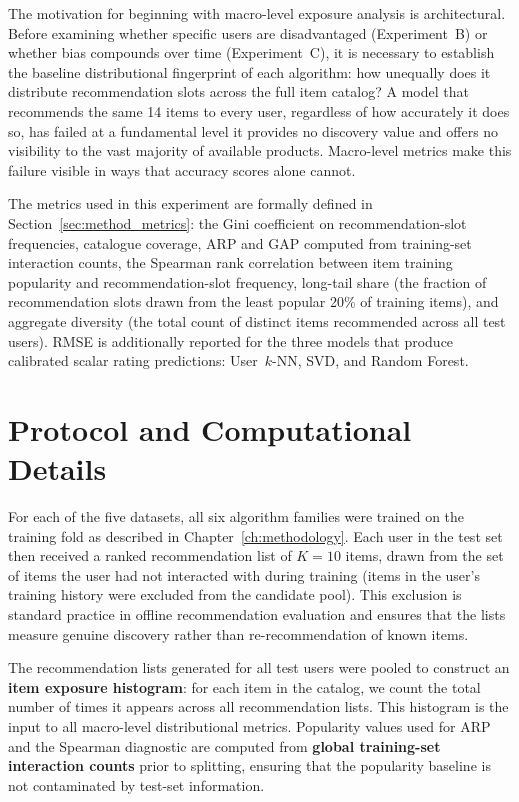 \documentclass[11pt,a4paper]{report}
\begin{document}
The motivation for beginning with macro-level exposure analysis is architectural. Before examining whether specific users are disadvantaged (Experiment~B) or whether bias compounds over time (Experiment~C), it is necessary to establish the baseline distributional fingerprint of each algorithm: how unequally does it distribute recommendation slots across the full item catalog? A model that recommends the same 14 items to every user, regardless of how accurately it does so, has failed at a fundamental level it provides no discovery value and offers no visibility to the vast majority of available products. Macro-level metrics make this failure visible in ways that accuracy scores alone cannot.

The metrics used in this experiment are formally defined in Section~\ref{sec:method_metrics}: the Gini coefficient on recommendation-slot frequencies, catalogue coverage, ARP and GAP computed from training-set interaction counts, the Spearman rank correlation between item training popularity and recommendation-slot frequency, long-tail share (the fraction of recommendation slots drawn from the least popular 20\% of training items), and aggregate diversity (the total count of distinct items recommended across all test users). RMSE is additionally reported for the three models that produce calibrated scalar rating predictions: User~$k$-NN, SVD, and Random Forest.

\section{Protocol and Computational Details}
\label{sec:expa_protocol}

For each of the five datasets, all six algorithm families were trained on the training fold as described in Chapter~\ref{ch:methodology}. Each user in the test set then received a ranked recommendation list of $K = 10$ items, drawn from the set of items the user had not interacted with during training (items in the user's training history were excluded from the candidate pool). This exclusion is standard practice in offline recommendation evaluation \citep{cremonesi2010accuracy} and ensures that the lists measure genuine discovery rather than re-recommendation of known items.

The recommendation lists generated for all test users were pooled to construct an \textbf{item exposure histogram}: for each item in the catalog, we count the total number of times it appears across all recommendation lists. This histogram is the input to all macro-level distributional metrics. Popularity values used for ARP and the Spearman diagnostic are computed from \textbf{global training-set interaction counts} prior to splitting, ensuring that the popularity baseline is not contaminated by test-set information.
\end{document}
